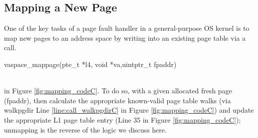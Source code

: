 \subsection{Mapping a New Page}
\label{sec:mapnewC}
One of the key tasks of a page fault handler in a general-purpose OS kernel is
to map new pages to an address space by writing into an existing page table via a call.\\
\centerline{\textsf{vaspace\_mappage(pte\_t *l4, void *va,uintptr\_t fpaddr)}}\\
in Figure \ref{fig:mapping_codeC}.
To do so, with a given allocated fresh page (\textsf{fpaddr}), then calculate the appropriate
known-valid page table walks (via \textsf{walkpgdir} Line \ref{line:call_walkpgdirC} in Figure \ref{fig:mapping_codeC}) and update
the appropriate L1 page table entry (Line 35 in Figure \ref{fig:mapping_codeC});
unmapping is the reverse of the logic we discuss here.
